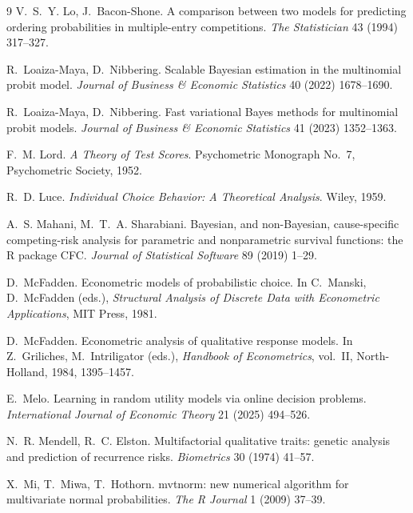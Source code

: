 \documentclass[12pt]{article}
\theoremstyle{remark}
\begin{document}
\begin{thebibliography}{9}
 V.~S.~Y. Lo, J.~Bacon-Shone.
A comparison between two models for predicting ordering probabilities in
multiple-entry competitions. \emph{The Statistician} 43 (1994) 317--327.

 R.~Loaiza-Maya, D.~Nibbering. Scalable Bayesian
estimation in the multinomial probit model. \emph{Journal of Business \&
Economic Statistics} 40 (2022) 1678--1690.

 R.~Loaiza-Maya,
D.~Nibbering. Fast variational Bayes methods for multinomial probit
models. \emph{Journal of Business \& Economic Statistics} 41 (2023)
1352--1363.

 F.~M. Lord. \emph{A Theory of Test
Scores}. Psychometric Monograph No.~7, Psychometric Society, 1952.

 R.~D. Luce. \emph{Individual Choice
Behavior: A Theoretical Analysis}. Wiley, 1959.

 A.~S. Mahani,
M.~T.~A. Sharabiani. Bayesian, and non-Bayesian, cause-specific
competing-risk analysis for parametric and nonparametric survival
functions: the R package CFC. \emph{Journal of Statistical Software} 89
(2019) 1--29.

 D.~McFadden. Econometric models of probabilistic
choice. In C.~Manski, D.~McFadden (eds.), \emph{Structural Analysis of
Discrete Data with Econometric Applications}, MIT Press, 1981.

 D.~McFadden. Econometric
analysis of qualitative response models. In Z.~Griliches,
M.~Intriligator (eds.), \emph{Handbook of Econometrics}, vol.~II,
North-Holland, 1984, 1395--1457.

 E.~Melo. Learning in random utility
models via online decision problems. \emph{International Journal of
Economic Theory} 21 (2025) 494--526.

 N.~R. Mendell, R.~C. Elston. Multifactorial
qualitative traits: genetic analysis and prediction of recurrence risks.
\emph{Biometrics} 30 (1974) 41--57.

 X.~Mi, T.~Miwa,
T.~Hothorn. mvtnorm: new numerical algorithm for multivariate normal
probabilities. \emph{The R Journal} 1 (2009) 37--39.


\end{thebibliography}
\end{document}
